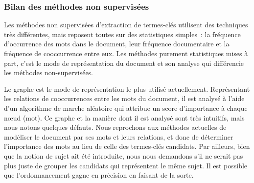       \subsubsection{Bilan des méthodes non supervisées}
      \label{subsubsec:main-state_of_the_art-automatic_keyphrase_extraction-unsupervised_keyphrase_extraction-bilan}
        Les méthodes non supervisées d'extraction de termes-clés utilisent des
        techniques très différentes, mais reposent toutes sur des statistiques
        simples~: la fréquence d'occurrence des mots dans le document, leur
        fréquence documentaire et la fréquence de cooccurrence entre eux. Les
        méthodes purement statistiques mises à part, c'est le mode de
        représentation du document et son analyse qui différencie les méthodes
        non-supervisées.
        
        Le graphe est le mode de représentation le plus utilisé actuellement.
        Représentant les relations de cooccurrences entre les mots du document,
        il est analysé à l'aide d'un algorithme de marche aléatoire qui attribue
        un score d'importance à chaque n\oe{}ud (mot). Ce graphe et la manière
        dont il est analysé sont très intuitifs, mais nous notons quelques
        défauts. Nous reprochons aux méthodes actuelles de modéliser le document
        par ses mots et leurs relations, et donc de déterminer l'importance des
        mots au lieu de celle des termes-clés candidats. Par ailleurs, bien que
        la notion de sujet ait été introduite, nous nous demandons s'il ne
        serait pas plus juste de grouper les candidats qui représentent le même
        sujet. Il est possible que l'ordonnancement gagne en précision en
        faisant de la sorte.

